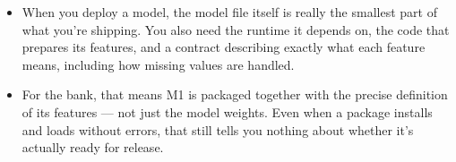 \documentclass[11pt,a4paper]{article}
\begin{document}
\begin{examplebox}[title after break={SPOKEN SCRIPT --- slide 11 continued}]
\begin{itemize}
\item When you deploy a model, the model file itself is really the smallest part of what you're shipping. You also need the runtime it depends on, the code that prepares its features, and a contract describing exactly what each feature means, including how missing values are handled.
\item For the bank, that means M1 is packaged together with the precise definition of its features — not just the model weights. Even when a package installs and loads without errors, that still tells you nothing about whether it's actually ready for release.
\end{itemize}
\end{examplebox}
\par\noindent{\scriptsize\textcolor{teal!60!black}{Reading anchor: Bass, §14.1.4 · Kalinowski, §13.3 · Nazir et al., §4.1, Table 12 · Breck et al., infra. test 6}}
\clearpage
\end{document}

